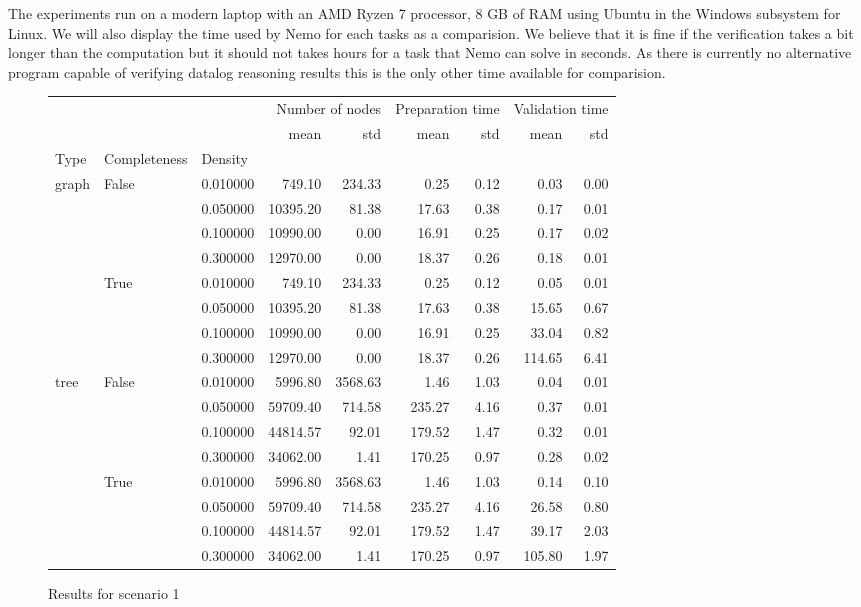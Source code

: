 The experiments run on a modern laptop with an AMD Ryzen 7 processor, 8 GB of RAM using Ubuntu in the Windows subsystem for Linux. We will also display the time used by Nemo for each tasks as a comparision. We believe that it is fine if the verification takes a bit longer than the computation but it should not takes hours for a task that Nemo can solve in seconds. As there is currently no alternative program capable of verifying datalog reasoning results this is the only other time available for comparision.

\begin{figure}
    \begin{tabular}{lllrrrrrr}
        &  &  & \multicolumn{2}{r}{Number of nodes} & \multicolumn{2}{r}{Preparation time} & \multicolumn{2}{r}{Validation time} \\
        &  &  & mean & std & mean & std & mean & std \\
       Type & Completeness & Density &  &  &  &  &  &  \\
       \multirow[c]{8}{*}{graph} & \multirow[c]{4}{*}{False} & 0.010000 & 749.10 & 234.33 & 0.25 & 0.12 & 0.03 & 0.00 \\
        &  & 0.050000 & 10395.20 & 81.38 & 17.63 & 0.38 & 0.17 & 0.01 \\
        &  & 0.100000 & 10990.00 & 0.00 & 16.91 & 0.25 & 0.17 & 0.02 \\
        &  & 0.300000 & 12970.00 & 0.00 & 18.37 & 0.26 & 0.18 & 0.01 \\
        & \multirow[c]{4}{*}{True} & 0.010000 & 749.10 & 234.33 & 0.25 & 0.12 & 0.05 & 0.01 \\
        &  & 0.050000 & 10395.20 & 81.38 & 17.63 & 0.38 & 15.65 & 0.67 \\
        &  & 0.100000 & 10990.00 & 0.00 & 16.91 & 0.25 & 33.04 & 0.82 \\
        &  & 0.300000 & 12970.00 & 0.00 & 18.37 & 0.26 & 114.65 & 6.41 \\
       \multirow[c]{8}{*}{tree} & \multirow[c]{4}{*}{False} & 0.010000 & 5996.80 & 3568.63 & 1.46 & 1.03 & 0.04 & 0.01 \\
        &  & 0.050000 & 59709.40 & 714.58 & 235.27 & 4.16 & 0.37 & 0.01 \\
        &  & 0.100000 & 44814.57 & 92.01 & 179.52 & 1.47 & 0.32 & 0.01 \\
        &  & 0.300000 & 34062.00 & 1.41 & 170.25 & 0.97 & 0.28 & 0.02 \\
        & \multirow[c]{4}{*}{True} & 0.010000 & 5996.80 & 3568.63 & 1.46 & 1.03 & 0.14 & 0.10 \\
        &  & 0.050000 & 59709.40 & 714.58 & 235.27 & 4.16 & 26.58 & 0.80 \\
        &  & 0.100000 & 44814.57 & 92.01 & 179.52 & 1.47 & 39.17 & 2.03 \\
        &  & 0.300000 & 34062.00 & 1.41 & 170.25 & 0.97 & 105.80 & 1.97 \\
       \end{tabular}
\caption{Results for scenario 1}       
\end{figure}

